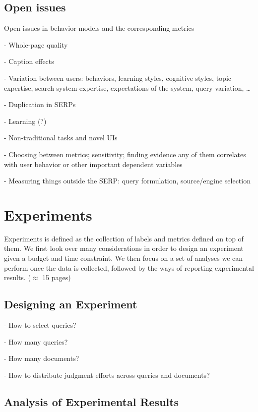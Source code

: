 \documentclass[openany]{now} %
\begin{document}
\section{Open issues}

Open issues in behavior models and the corresponding metrics

- Whole-page quality

- Caption effects

- Variation between users: behaviors, learning styles, cognitive styles, topic expertise, search system expertise, expectations of the system, query variation, \dots

- Duplication in SERPs

- Learning (?)

- Non-traditional tasks and novel UIs

- Choosing between metrics; sensitivity; finding evidence any of them correlates with user behavior or other important dependent variables

- Measuring things outside the SERP: query formulation, source/engine selection

\chapter{Experiments}
\label{c-experiment}

Experiments is defined as the collection of labels and metrics defined on top of them. We first look over many considerations in order to design an experiment given a budget and time constraint. We then focus on a set of analyses we can perform once the data is collected, followed by the ways of reporting experimental results. (\ensuremath{\approx} 15 pages)

\section{Designing an Experiment}

- How to select queries?

- How many queries? \cite{Sakai:2014}

- How many documents? \cite{CarterettePFK09}

- How to distribute judgment efforts across queries and documents? \cite{CarterettePKAA09, YilmazR09}


\section{Analysis of Experimental Results}
\end{document}
